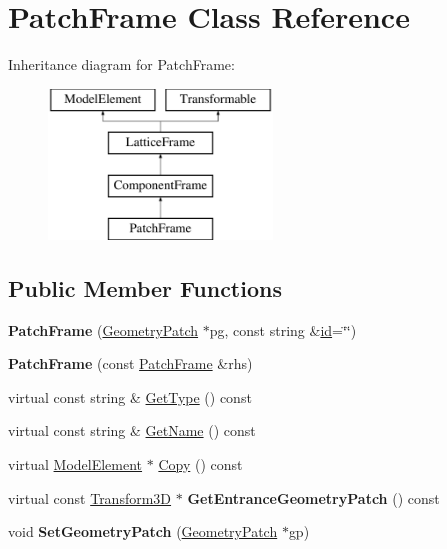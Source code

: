 \hypertarget{classPatchFrame}{}\section{Patch\+Frame Class Reference}
\label{classPatchFrame}
Inheritance diagram for Patch\+Frame\+:\begin{figure}[H]
\begin{center}
\leavevmode
\includegraphics[height=4.000000cm]{classPatchFrame}
\end{center}
\end{figure}
\subsection*{Public Member Functions}
\begin{DoxyCompactItemize}
\item 
\mbox{\label{classPatchFrame_aac5f9293d32f7df83696902a3ba9c828}} 
{\bfseries Patch\+Frame} (\hyperlink{classGeometryPatch}{Geometry\+Patch} $\ast$pg, const string \&\hyperlink{classModelElement_aada171ead2085c75b592cf07d91bc5c2}{id}=\char`\"{}\char`\"{})
\item 
\mbox{\label{classPatchFrame_a0f25ac08064516ed6c581bcffa26ee60}} 
{\bfseries Patch\+Frame} (const \hyperlink{classPatchFrame}{Patch\+Frame} \&rhs)
\item 
virtual const string \& \hyperlink{classPatchFrame_a1ef493fda343de4400b198097db32f20}{Get\+Type} () const
\item 
virtual const string \& \hyperlink{classPatchFrame_a51ebb7649aa5fc1403bcd70925d7c85f}{Get\+Name} () const
\item 
virtual \hyperlink{classModelElement}{Model\+Element} $\ast$ \hyperlink{classPatchFrame_a4103f544750beb79b95795c6be388c1d}{Copy} () const
\item 
\mbox{\label{classPatchFrame_acb2a849a533a090741bf45095f9f43d5}} 
virtual const \hyperlink{classTransform3D}{Transform3D} $\ast$ {\bfseries Get\+Entrance\+Geometry\+Patch} () const
\item 
\mbox{\label{classPatchFrame_a4a6be1febf2f1aebd68876213b854a13}} 
void {\bfseries Set\+Geometry\+Patch} (\hyperlink{classGeometryPatch}{Geometry\+Patch} $\ast$gp)
\end{DoxyCompactItemize}
